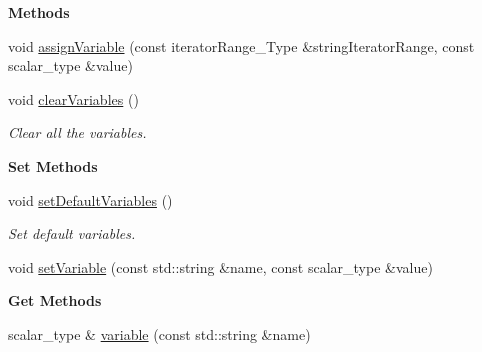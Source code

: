 \begin{Indent}\textbf{ Methods}\par
\begin{DoxyCompactItemize}
\item 
void \hyperlink{classLifeV_1_1ParserSpiritGrammar_a7ccdf51b58cd920a08d18adaea2524ca}{assign\+Variable} (const iterator\+Range\+\_\+\+Type \&string\+Iterator\+Range, const scalar\+\_\+type \&value)
\item 
\mbox{\label{classLifeV_1_1ParserSpiritGrammar_a81b8e2abdda8a35738367f2dcfb69c75}} 
void \hyperlink{classLifeV_1_1ParserSpiritGrammar_a81b8e2abdda8a35738367f2dcfb69c75}{clear\+Variables} ()
\begin{DoxyCompactList}\small\item\em Clear all the variables. \end{DoxyCompactList}\end{DoxyCompactItemize}
\end{Indent}
\begin{Indent}\textbf{ Set Methods}\par
\begin{DoxyCompactItemize}
\item 
\mbox{\label{classLifeV_1_1ParserSpiritGrammar_aa48cdca46ab32d3c1e55e656aa82e902}} 
void \hyperlink{classLifeV_1_1ParserSpiritGrammar_aa48cdca46ab32d3c1e55e656aa82e902}{set\+Default\+Variables} ()
\begin{DoxyCompactList}\small\item\em Set default variables. \end{DoxyCompactList}\item 
void \hyperlink{classLifeV_1_1ParserSpiritGrammar_add7ee83b39ebf408710c820a4365eafa}{set\+Variable} (const std\+::string \&name, const scalar\+\_\+type \&value)
\end{DoxyCompactItemize}
\end{Indent}
\begin{Indent}\textbf{ Get Methods}\par
\begin{DoxyCompactItemize}
\item 
scalar\+\_\+type \& \hyperlink{classLifeV_1_1ParserSpiritGrammar_a53ba937b8359b093d650d1a907d7b738}{variable} (const std\+::string \&name)
\end{DoxyCompactItemize}
\end{Indent}


